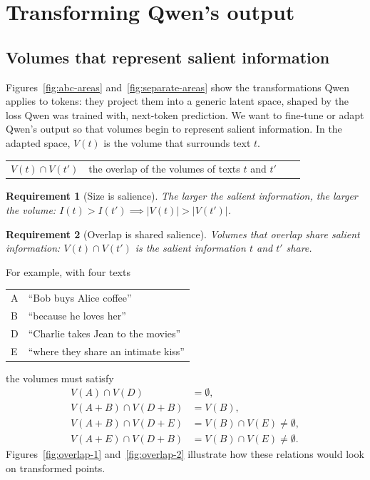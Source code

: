 \documentclass[11pt]{article}
\makeatletter
\newtheorem{requirement}{Requirement}
\theoremstyle{remark}
\newenvironment{symbols}
  {\par\smallskip\noindent\small\begin{tabular}{@{}>{$}l<{$}@{\quad}p{0.82\linewidth}@{}}}
  {\end{tabular}\par\medskip}
\makeatother
\begin{document}
\section{Transforming Qwen's output}\label{sec:transform}

\subsection{Volumes that represent salient information}\label{sec:volumes}

Figures~\ref{fig:abc-areas} and~\ref{fig:separate-areas} show the transformations Qwen applies to tokens: they project them into a generic latent space, shaped by the loss Qwen was trained with, next-token prediction. We want to fine-tune or adapt Qwen's output so that volumes begin to represent salient information. In the adapted space, $V(t)$ is the volume that surrounds text $t$.

\begin{symbols}
V(t) \cap V(t') & the overlap of the volumes of texts $t$ and $t'$ \\
\end{symbols}

\begin{requirement}[Size is salience]\label{req:size-is-salience}
The larger the salient information, the larger the volume: $I(t) > I(t') \implies |V(t)| > |V(t')|$.
\end{requirement}

\begin{requirement}[Overlap is shared salience]\label{req:overlap-is-shared}
Volumes that overlap share salient information: $V(t) \cap V(t')$ is the salient information $t$ and $t'$ share.
\end{requirement}

For example, with four texts
\begin{center}
\begin{tabular}{@{}ll@{}}
A & ``Bob buys Alice coffee'' \\
B & ``because he loves her'' \\
D & ``Charlie takes Jean to the movies'' \\
E & ``where they share an intimate kiss'' \\
\end{tabular}
\end{center}
the volumes must satisfy
\begin{align*}
V(A) \cap V(D) &= \emptyset , \\
V(A + B) \cap V(D + B) &= V(B) , \\
V(A + B) \cap V(D + E) &= V(B) \cap V(E) \ne \emptyset , \\
V(A + E) \cap V(D + B) &= V(B) \cap V(E) \ne \emptyset .
\end{align*}
Figures~\ref{fig:overlap-1} and~\ref{fig:overlap-2} illustrate how these relations would look on transformed points.
\end{document}
